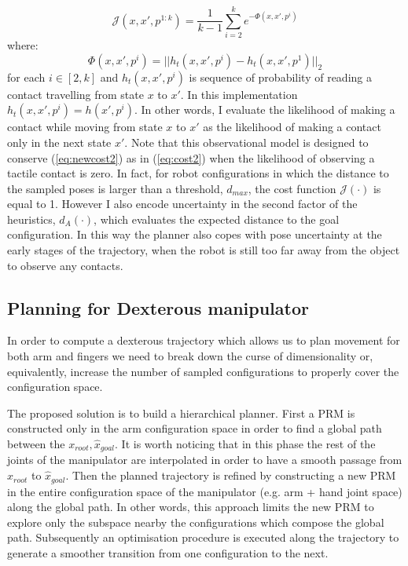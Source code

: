 \begin{equation}\label{eq:modifiedcost}
\mathcal{J}(x,x',p^{1:k})=\frac{1}{k-1}\sum_{i=2}^k{e^{-\Phi(x,x',p^i)}}
\end{equation}
where:
$$
\Phi(x,x',p^i)=||h_t(x,x',p^i)-h_t(x,x',p^1)||_2
$$
for each $i\in[2,k]$ and $h_t(x,x',p^i)$ is sequence of probability of reading a contact travelling from state $x$ to $x'$. In this implementation $h_t(x,x',p^i)=h(x',p^i)$. In other words, I evaluate the likelihood of making a contact while moving from state $x$ to $x'$ as the likelihood of making a contact only in the next state $x'$.
Note that this observational model is designed to conserve (\ref{eq:newcost2}) as in (\ref{eq:cost2}) when the likelihood of observing a tactile contact is zero. In fact, for robot configurations in which the distance to the sampled poses is larger than a threshold, $d_{max}$, the cost function $\mathcal{J}(\cdot)$  is equal to 1. However I also encode uncertainty in the second factor of the heuristics, $d_A(\cdot)$, which evaluates the expected distance to the goal configuration. In this way the planner also copes with pose uncertainty at the early stages of the trajectory, when the robot is still too far away from the object to observe any contacts. 

\subsection{Planning for Dexterous manipulator}

In order to compute a dexterous trajectory which allows us to plan movement for both arm and fingers we need to break down the curse of dimensionality or, equivalently, increase the number of sampled configurations to properly cover the configuration space. 

The proposed solution is to build a hierarchical planner. First a PRM is constructed only in the arm configuration space in order to find a global path between the $x_{root},\hat{x}_{goal}$. It is worth noticing that in this phase the rest of the joints of the manipulator are interpolated in order to have a smooth passage from $x_{root}$ to $\hat{x}_{goal}$. Then the planned trajectory is refined by constructing a new PRM in the entire configuration space of the manipulator (e.g. arm + hand joint space) along the global path. In other words, this approach limits the new PRM to explore only the subspace nearby the configurations which compose the global path.  
Subsequently an optimisation procedure is executed along the trajectory to generate a smoother transition from one configuration to the next.

